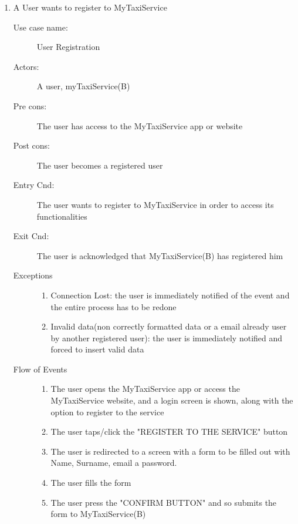 \documentclass[11pt]{article} %
\begin{document}
\begin{enumerate}
	       \item A User wants to register to MyTaxiService
		\begin{description}
		        \item [Use case name:] User Registration
		        \item [Actors:] A user, myTaxiService(B)
		        \item [Pre cons:] The user has access to the MyTaxiService app or website
		        \item [Post cons:] The user becomes a registered user
		        \item [Entry Cnd:] The user wants to register to MyTaxiService in order
		        to access its functionalities
		        \item [Exit Cnd:] The user is acknowledged that MyTaxiService(B) has registered him
		        \item [Exceptions]\hfill
			\begin{enumerate}
			          \item Connection Lost: the user is immediately notified of the event and the entire process
			          has to be redone
			          \item Invalid data(non correctly formatted data or a email already
			          user by another registered user): the user is immediately notified and forced to insert valid data
			\end{enumerate}
		        \item [Flow of Events]\hfill
			\begin{enumerate}
			          \item The user opens the MyTaxiService app or access the MyTaxiService website, and a login
			            screen is shown, along with the option to register to the service
			          \item The user taps/click the "REGISTER TO THE SERVICE" button
			          \item The user is redirected to a screen with a form to be filled out with Name, Surname, email a password.
			          \item The user fills the form
			          \item The user press the "CONFIRM BUTTON" and so submits the form to MyTaxiService(B)
			\end{enumerate}
		\end{description}
	

\end{enumerate}
\end{document}
